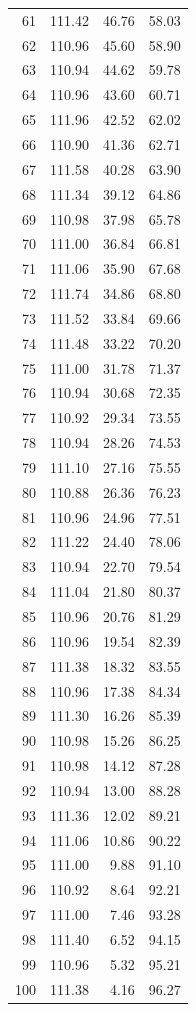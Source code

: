\begin{longtable}{rrrr}
61 & 111.42 & 46.76 & 58.03 \\
62 & 110.96 & 45.60 & 58.90 \\
63 & 110.94 & 44.62 & 59.78 \\
64 & 110.96 & 43.60 & 60.71 \\
65 & 111.96 & 42.52 & 62.02 \\
66 & 110.90 & 41.36 & 62.71 \\
67 & 111.58 & 40.28 & 63.90 \\
68 & 111.34 & 39.12 & 64.86 \\
69 & 110.98 & 37.98 & 65.78 \\
70 & 111.00 & 36.84 & 66.81 \\
71 & 111.06 & 35.90 & 67.68 \\
72 & 111.74 & 34.86 & 68.80 \\
73 & 111.52 & 33.84 & 69.66 \\
74 & 111.48 & 33.22 & 70.20 \\
75 & 111.00 & 31.78 & 71.37 \\
76 & 110.94 & 30.68 & 72.35 \\
77 & 110.92 & 29.34 & 73.55 \\
78 & 110.94 & 28.26 & 74.53 \\
79 & 111.10 & 27.16 & 75.55 \\
80 & 110.88 & 26.36 & 76.23 \\
81 & 110.96 & 24.96 & 77.51 \\
82 & 111.22 & 24.40 & 78.06 \\
83 & 110.94 & 22.70 & 79.54 \\
84 & 111.04 & 21.80 & 80.37 \\
85 & 110.96 & 20.76 & 81.29 \\
86 & 110.96 & 19.54 & 82.39 \\
87 & 111.38 & 18.32 & 83.55 \\
88 & 110.96 & 17.38 & 84.34 \\
89 & 111.30 & 16.26 & 85.39 \\
90 & 110.98 & 15.26 & 86.25 \\
91 & 110.98 & 14.12 & 87.28 \\
92 & 110.94 & 13.00 & 88.28 \\
93 & 111.36 & 12.02 & 89.21 \\
94 & 111.06 & 10.86 & 90.22 \\
95 & 111.00 & 9.88 & 91.10 \\
96 & 110.92 & 8.64 & 92.21 \\
97 & 111.00 & 7.46 & 93.28 \\
98 & 111.40 & 6.52 & 94.15 \\
99 & 110.96 & 5.32 & 95.21 \\
100 & 111.38 & 4.16 & 96.27 \\
\end{longtable}
